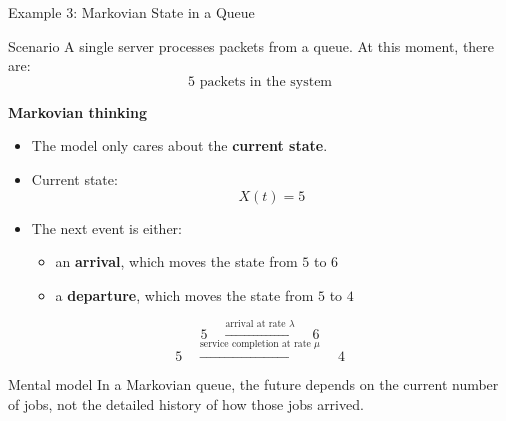 \documentclass[aspectratio=169]{beamer}
\begin{document}
\begin{frame}{Example 3: Markovian State in a Queue}
\tiny

\begin{block}{Scenario}
A single server processes packets from a queue. At this moment, there are:
\[
5 \text{ packets in the system}
\]
\end{block}

\vspace{0.2cm}

\textbf{Markovian thinking}

\begin{itemize}
    \item The model only cares about the \textbf{current state}.
    \item Current state:
    \[
        X(t) = 5
    \]
    \item The next event is either:
    \begin{itemize}
        \item an \textbf{arrival}, which moves the state from $5$ to $6$
        \item a \textbf{departure}, which moves the state from $5$ to $4$
    \end{itemize}
\end{itemize}

\vspace{0.15cm}

\begin{center}
\[
5
\quad \xrightarrow{\text{arrival at rate } \lambda} \quad
6
\]
\[
5
\quad \xrightarrow{\text{service completion at rate } \mu} \quad
4
\]
\end{center}

\vspace{0.15cm}

\begin{alertblock}{Mental model}
In a Markovian queue, the future depends on the current number of jobs, not the detailed history of how those jobs arrived.
\end{alertblock}

\end{frame}
\end{document}
